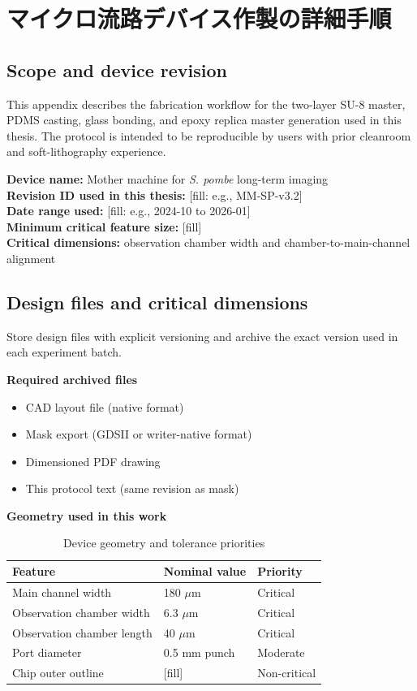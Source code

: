 \chapter{マイクロ流路デバイス作製の詳細手順}
\label{appendix:microfluidic_protocol}

\section{Scope and device revision}
This appendix describes the fabrication workflow for the two-layer SU-8 master, PDMS casting, glass bonding, and epoxy replica master generation used in this thesis. The protocol is intended to be reproducible by users with prior cleanroom and soft-lithography experience.

\textbf{Device name:} Mother machine for \textit{S. pombe} long-term imaging \\
\textbf{Revision ID used in this thesis:} [fill: e.g., MM-SP-v3.2] \\
\textbf{Date range used:} [fill: e.g., 2024-10 to 2026-01] \\
\textbf{Minimum critical feature size:} [fill] \\
\textbf{Critical dimensions:} observation chamber width and chamber-to-main-channel alignment

\section{Design files and critical dimensions}
Store design files with explicit versioning and archive the exact version used in each experiment batch.

\textbf{Required archived files}
\begin{itemize}
  \item CAD layout file (native format)
  \item Mask export (GDSII or writer-native format)
  \item Dimensioned PDF drawing
  \item This protocol text (same revision as mask)
\end{itemize}

\textbf{Geometry used in this work}
\begin{table}[H]
\centering
\caption{Device geometry and tolerance priorities}
\label{tab:device_geometry}
\begin{tabular}{lll}
\hline
\textbf{Feature} & \textbf{Nominal value} & \textbf{Priority} \\
\hline
Main channel width & 180 $\mu$m & Critical \\
Observation chamber width & 6.3 $\mu$m & Critical \\
Observation chamber length & 40 $\mu$m & Critical \\
Port diameter & 0.5 mm punch & Moderate \\
Chip outer outline & [fill] & Non-critical \\
\hline
\end{tabular}
\end{table}

